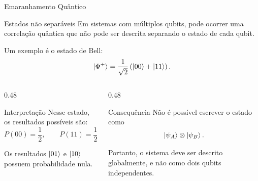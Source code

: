 \begin{frame}{Emaranhamento Quântico}

\begin{block}{Estados não separáveis}
Em sistemas com múltiplos qubits, pode ocorrer uma correlação quântica que
não pode ser descrita separando o estado de cada qubit.


Um exemplo é o estado de Bell:
\[
  \ket{\Phi^{+}}
  =
  \frac{1}{\sqrt{2}}
  \left(
    \ket{00}
    +
    \ket{11}
  \right).
\]


\end{block}

\vspace{0.2cm}

\begin{columns}[T,onlytextwidth]


\begin{column}{0.48\textwidth}
  \begin{block}{Interpretação}
    Nesse estado, os resultados possíveis são:
    \[
      P(00)=\frac{1}{2},
      \qquad
      P(11)=\frac{1}{2}.
    \]

    Os resultados $\ket{01}$ e $\ket{10}$ possuem probabilidade nula.
  \end{block}
\end{column}

\begin{column}{0.48\textwidth}
  \begin{block}{Consequência}
    Não é possível escrever o estado como
    \[
      \ket{\psi_A}\otimes\ket{\psi_B}.
    \]

    Portanto, o sistema deve ser descrito globalmente, e não como dois
    qubits independentes.
  \end{block}
\end{column}

\end{columns}

\end{frame}

